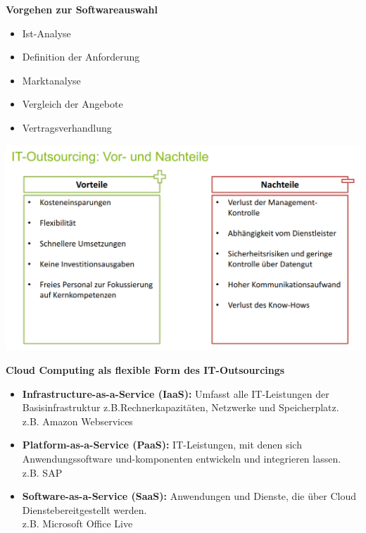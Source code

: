 \documentclass[a4]{scrartcl}
\begin{document}
\textbf{Vorgehen zur Softwareauswahl}

\begin{itemize}
\item Ist-Analyse
\item Definition der Anforderung
\item Marktanalyse
\item Vergleich der Angebote
\item Vertragsverhandlung
\end{itemize}



\includegraphics[scale=0.3]{out.png}


\textbf{Cloud Computing als flexible Form des IT-Outsourcings}
\begin{itemize}
\item \textbf{Infrastructure-as-a-Service (IaaS):} Umfasst alle IT-Leistungen der Basisinfrastruktur z.B.Rechnerkapazitäten, Netzwerke und Speicherplatz. \\
z.B. Amazon Webservices
\item \textbf{Platform-as-a-Service (PaaS):} IT-Leistungen, mit denen sich Anwendungssoftware  und-komponenten entwickeln und integrieren lassen. \\
z.B. SAP
\item \textbf{Software-as-a-Service (SaaS):} Anwendungen und Dienste, die über Cloud Dienstebereitgestellt werden. \\
z.B. Microsoft Office Live
\end{itemize}
\end{document}
